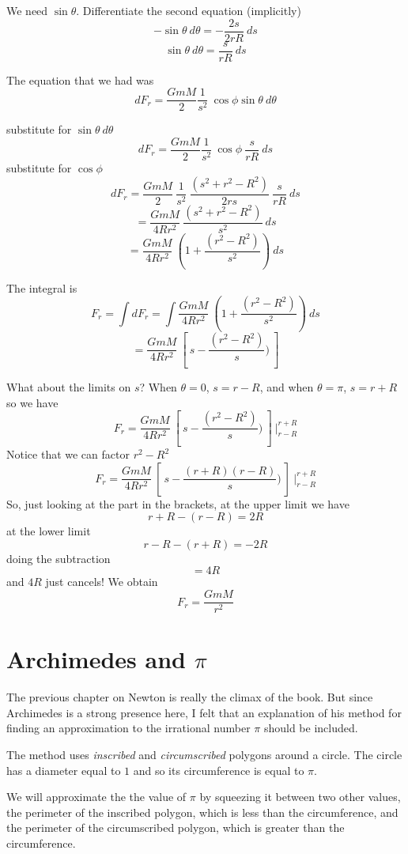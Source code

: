 \documentclass[11pt, oneside]{report}   	%
\begin{document}
We need $\sin \theta$.  Differentiate the second equation (implicitly)
\[ -\sin \theta \ d \theta = -\frac{2s}{2rR} \ ds  \]
\[ \sin \theta \ d \theta = \frac{s}{rR} \ ds \]

The equation that we had was
\[ dF_r = \frac{GmM}{2} \frac{1}{s^2} \ \cos \phi \sin \theta \ d \theta \]

substitute for $\sin \theta \ d \theta$
\[ dF_r = \frac{GmM}{2} \frac{1}{s^2} \ \cos \phi \ \frac{s}{rR} \ ds \]
substitute for $\cos \phi$
\[ dF_r = \frac{GmM}{2} \ \frac{1}{s^2} \ \frac{(s^2 + r^2 - R^2)}{2rs} \ \frac{s}{rR} \ ds \]
\[ =  \frac{GmM}{4R r^2} \ \frac{(s^2 + r^2 - R^2)}{s^2} \ ds \]
\[ =  \frac{GmM}{4R r^2} \ (1 + \frac{(r^2 - R^2)}{s^2}) \ ds \]

The integral is
\[ F_r = \int dF_r = \int \frac{GmM}{4R r^2} \ (1 + \frac{(r^2 - R^2)}{s^2}) \ ds \]
\[ =  \frac{GmM}{4R r^2} \ [ \ s -  \frac{(r^2 - R^2)}{s}) \ ]  \]

What about the limits on $s$?  When $\theta = 0$, $s = r - R$, and when $\theta = \pi$, $s = r + R$ so we have
\[ F_r = \frac{GmM}{4R r^2} \ [ \ s -  \frac{(r^2 - R^2)}{s}) \ ] \ \bigg |_{r - R}^{r +R} \]
Notice that we can factor $r^2 - R^2$
\[ F_r = \frac{GmM}{4R r^2} \ [ \ s -  \frac{(r+R)(r-R)}{s}) \ ] \ \bigg |_{r - R}^{r +R} \]
So, just looking at the part in the brackets, at the upper limit we have
\[ r + R - (r - R) = 2R \]
at the lower limit
\[ r - R - (r + R) = -2R \]
doing the subtraction 
\[ = 4R \]
and $4R$ just cancels!  We obtain
\[ F_r = \frac{GmM}{r^2} \]

\section{Archimedes and $\pi$}

The previous chapter on Newton is really the climax of the book.  But since Archimedes is a strong presence here, I felt that an explanation of his method for finding an approximation to the irrational number $\pi$ should be included.  

The method uses \emph{inscribed} and \emph{circumscribed} polygons around a circle.  The circle has a diameter equal to $1$ and so its circumference is equal to $\pi$.

We will approximate the the value of $\pi$ by squeezing it between two other values, the perimeter of the inscribed polygon, which is less than the circumference, and the perimeter of the circumscribed polygon, which is greater than the circumference.
\end{document}
